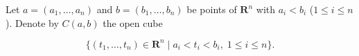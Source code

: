 Let $a = (a_1, \ldots, a_n)$ and $b = (b_1, \ldots, b_n)$ be points of $\mathbf{R}^n$ with $a_i < b_i$ ($1 \leq i \leq n$). Denote by $C(a, b)$ the open cube

$$\{(t_1, \ldots, t_n) \in \mathbf{R}^n \mid a_i < t_i < b_i,\; 1 \leq i \leq n\}.$$

